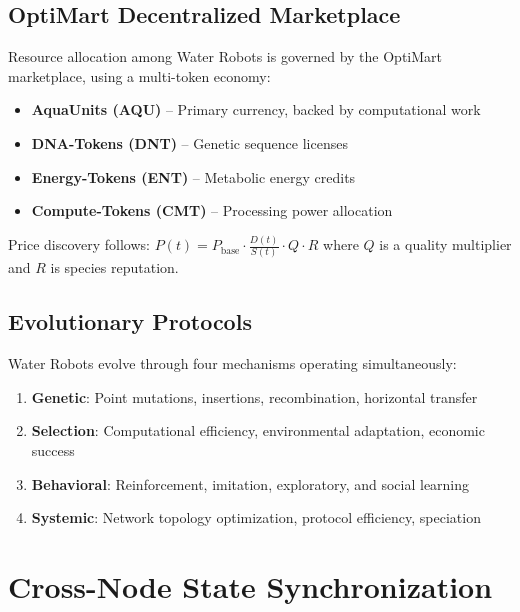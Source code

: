 \documentclass[11pt,a4paper,twocolumn]{article}
\begin{document}
\subsection{OptiMart Decentralized Marketplace}

Resource allocation among Water Robots is governed by the OptiMart marketplace,
using a multi-token economy:

\begin{itemize}[nosep,leftmargin=*]
    \item \textbf{AquaUnits (AQU)} -- Primary currency, backed by computational work
    \item \textbf{DNA-Tokens (DNT)} -- Genetic sequence licenses
    \item \textbf{Energy-Tokens (ENT)} -- Metabolic energy credits
    \item \textbf{Compute-Tokens (CMT)} -- Processing power allocation
\end{itemize}

Price discovery follows: $P(t) = P_{\text{base}} \cdot \frac{D(t)}{S(t)} \cdot Q \cdot R$
where $Q$ is a quality multiplier and $R$ is species reputation.

\subsection{Evolutionary Protocols}

Water Robots evolve through four mechanisms operating simultaneously:

\begin{enumerate}[nosep,leftmargin=*]
    \item \textbf{Genetic}: Point mutations, insertions, recombination, horizontal transfer
    \item \textbf{Selection}: Computational efficiency, environmental adaptation, economic success
    \item \textbf{Behavioral}: Reinforcement, imitation, exploratory, and social learning
    \item \textbf{Systemic}: Network topology optimization, protocol efficiency, speciation
\end{enumerate}

\section{Cross-Node State Synchronization}
\label{sec:sync}
\end{document}

